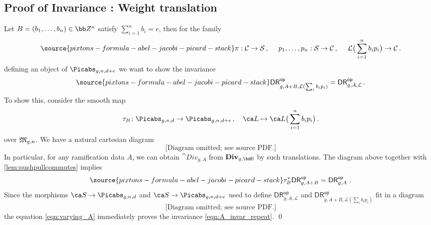 \subsection{Proof of Invariance \invnrA{}: {\rm Weight translation}}

Let $B=(b_1,\ldots,b_n) \in \bb Z^n$ satisfy $\sum_{i=1}^n b_i=e$, then for the family
    \begin{equation}
    \label{ff44997}
\source{pixtons-formula-abel-jacobi-picard-stack}
    \pi:\mathcal{C} \rightarrow \mathcal{S}\, , \ \ \ \ p_1,\ldots,p_n: \mathcal{S} \rightarrow \mathcal{C}\, , \ \ \ \
        \mathcal{L}\big(\sum_{i=1}^n b_i p_i\big) \rightarrow \mathcal{C}\, .
        \end{equation}
 defining an object of $\Picabs_{g,n,d+e}$ we want to show  the invariance
 \begin{equation} \label{eqn:A_invar_repeat}
\source{pixtons-formula-abel-jacobi-picard-stack}
 \mathsf{DR}^{\mathsf{op}}_{g,A+B, \mathcal{L}(\sum_i b_i p_i)}
        =\mathsf{DR}^{\mathsf{op}}_{g,A, \mathcal{L}}
        \, .
 \end{equation}
To show this, consider the smooth map
\begin{equation}
\tau_B\colon \Picabs_{g,n,d} \to \Picabs_{g,n,d+e} \, , \ \ \
\ca L \mapsto \ca L \big(\sum_{i=1}^n b_i p_i\big)\, .
\end{equation}
over $\frak M_{g,n}$. We have  a natural cartesian diagram
\begin{equation}
 \text{[Diagram omitted; see source PDF.]}
\end{equation}
In particular, for any ramification data
$A$, we can obtain $\cat{Div}_{g,A}$ from $\cat{Div}_{g,\bd 0}$ by such translations. The diagram above together with \cref{lem:pushpullcommutes} implies
\begin{equation} \label{eqn:varying_A}
\source{pixtons-formula-abel-jacobi-picard-stack}
    \tau_B^* \mathsf{DR}^{\mathsf{op}}_{g,A+B} = \mathsf{DR}^{\mathsf{op}}_{g,A}\ .
\end{equation}
Since the morphisms $\ca S \to \Picabs_{g,n,d}$ and $\ca S \to \Picabs_{g,n,d+e}$ used to define $\mathsf{DR}^{\mathsf{op}}_{g,A, \mathcal{L}}$ and $\mathsf{DR}^{\mathsf{op}}_{g,A+B, \mathcal{L}(\sum_i b_i p_i)}$ fit in a diagram
\[
\text{[Diagram omitted; see source PDF.]}
\]
the equation \eqref{eqn:varying_A} immediately proves the invariance \eqref{eqn:A_invar_repeat}. \qed



